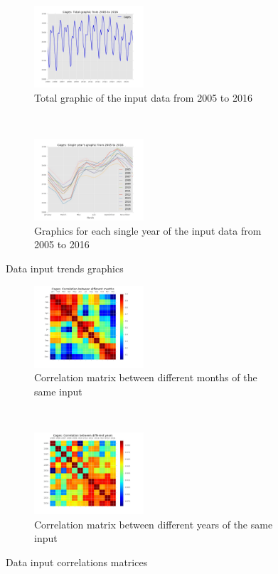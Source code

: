\begin{figure}[h]
    \centering
    \begin{subfigure}[t]{0.5\textwidth}
        \centering
        \includegraphics[height=1.2in]{Files/Cages_Total.jpg}
        \caption{Total graphic of the input data from 2005 to 2016}
    \end{subfigure}%
    ~ 
    \begin{subfigure}[t]{0.5\textwidth}
        \centering
        \includegraphics[height=1.2in]{Files/Cages_Years.jpg}
        \caption{Graphics for each single year of the input data from 2005 to 2016}
    \end{subfigure}
    \caption{Data input trends graphics}
\end{figure}

\begin{figure}[h]

    \begin{subfigure}[t]{0.5\textwidth}
        \centering
        \includegraphics[height=1.2in]{Files/Cages_Months_Matrix.jpg}
        \caption{Correlation matrix between different months of the same input}
    \end{subfigure}%
    ~ 
    \begin{subfigure}[t]{0.5\textwidth}
        \centering
        \includegraphics[height=1.2in]{Files/Cages_Years_Matrix.jpg}
        \caption{Correlation matrix between different years of the same input}
    \end{subfigure}
    \caption{Data input correlations matrices}
\end{figure}

